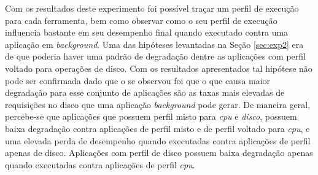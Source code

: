 Com os resultados deste experimento foi possível traçar um perfil de execução para cada ferramenta, bem como observar como o seu perfil de execução influencia bastante em seu desempenho final quando executado contra uma aplicação em \textit{background}. Uma das hipóteses levantadas na Seção \ref{sec:exp2} era de que poderia haver uma padrão de degradação dentre as aplicações com perfil voltado para operações de disco. Com os resultados apresentados tal hipótese não pode ser confirmada dado que o se observou foi que o que causa maior degradação para esse conjunto de aplicações são as taxas mais elevadas de requisições no disco que uma aplicação \textit{background} pode gerar. De maneira geral, percebe-se que aplicações que possuem perfil misto para \textit{cpu} e \textit{disco}, possuem baixa degradação contra aplicações de perfil misto e de perfil voltado para \textit{cpu}, e uma elevada perda de desempenho quando executadas contra aplicações de perfil apenas de disco. Aplicações com perfil de disco possuem baixa degradação apenas quando executadas contra aplicações de perfil \textit{cpu}. 



  

